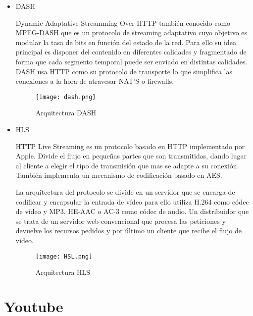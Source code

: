 \begin{itemize}
\item DASH

Dynamic Adaptative Streamming Over HTTP también conocido como MPEG-DASH que es un protocolo de streaming adaptativo cuyo objetivo es modular la tasa de bits en función del estado de la red. Para ello su idea principal es disponer del contenido en diferentes calidades y fragmentado de forma que cada segmento temporal puede ser enviado en distintas calidades. DASH usa HTTP como su protocolo de transporte lo que simplifica las conexiones a la hora de atravesar NAT’S o firewalls.

\begin{figure}[H]
    \centering
    \texttt{[image: dash.png]}
    \caption{Arquitectura DASH}
\end{figure}

\item HLS

HTTP Live Streaming es un protocolo basado en HTTP implementado por Apple. Divide el flujo en pequeñas partes que son transmitidas, dando lugar al cliente a elegir el tipo de transmisión que mas se adapte a su conexión. También implementa un mecanismo de codificación basado en AES.

La arquitectura del protocolo se divide en un servidor que se encarga de codificar y encapsular la entrada de vídeo para ello utiliza H.264 como códec de vídeo y MP3, HE-AAC o AC-3 como códec de audio. Un distribuidor que se trata de un servidor web convencional que procesa las peticiones y devuelve los recursos pedidos y por último un cliente que recibe el flujo de vídeo.

\begin{figure}[H]
    \centering
    \texttt{[image: HSL.png]}
    \caption{Arquitectura HLS}
\end{figure}    
\end{itemize}

\section{Youtube}

